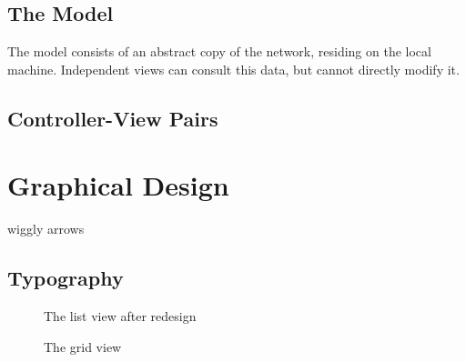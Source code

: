 \subsection{The Model}

	The model consists of an abstract copy of the network, residing on the local machine. Independent views can consult this data, but cannot directly modify it.

\subsection{Controller-View Pairs}

\section{Graphical Design}
	wiggly arrows
\subsection{Typography}

\begin{figure}[ht]
\centering
\caption{The list view after redesign}
\label{fig:final_list}
\end{figure}

\begin{figure}[ht]
\centering
\caption{The grid view}
\label{fig:grid}
\end{figure}

